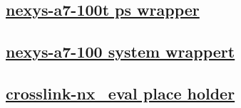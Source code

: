\documentclass{article}
\begin{document}
  


  \subsection{\href{../files/system_ps_wrapper-v.html}{nexys-a7-100t ps wrapper}}
  \subsection{\href{../files/system_wrapper-v.html}{nexys-a7-100 system wrappert}}
  \subsection{\href{../files2/system_wrapper-v.html}{crosslink-nx_eval place holder}}
\end{document}
